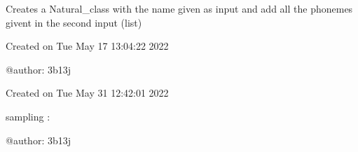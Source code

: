 \documentclass[letterpaper,10pt,english]{sphinxmanual}
\begin{document}

\begin{fulllineitems}
\label{\detokenize{index:Natural_class.list2class}}
\sphinxAtStartPar
Creates a Natural\_class with the name given as input and add all the phonemes givent in the second input (list)

\end{fulllineitems}

\label{\detokenize{index:module-rd_changer}}
\sphinxAtStartPar
Created on Tue May 17 13:04:22 2022

\sphinxAtStartPar
@author: 3b13j

\label{\detokenize{index:module-Sampling}}
\sphinxAtStartPar
Created on Tue May 31 12:42:01 2022

\sphinxAtStartPar
sampling :

\sphinxAtStartPar
@author: 3b13j
\end{document}
